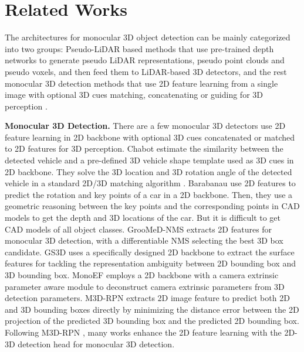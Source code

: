 \documentclass[10pt,twocolumn,letterpaper]{article}
\begin{document}
\section{Related Works}
The architectures for monocular 3D object detection can be mainly categorized into two groups:
Pseudo-LiDAR based methods \cite{Liang_corr,simonelli2021we,chu2021neighbor} that use pre-trained depth networks to
generate pseudo LiDAR representations,  pseudo point clouds and pseudo voxels, and then feed them to LiDAR-based 3D detectors, and the rest monocular 3D detection methods that use 2D feature learning from a single image with optional 3D cues matching, concatenating or guiding for 3D perception \cite{Lu_2021_ICCV,liu2021autoshape,MonoFlex,Zou_2021_ICCV,reading2021categorical,rukhovich2021imvoxelnet,murez2020atlas}. 


\textbf{Monocular 3D Detection.} There are a few monocular 3D detectors use 2D feature learning in 2D backbone with optional 3D cues concatenated or matched to 2D features for 3D perception.
Chabot  \cite{chabot2017deep} estimate the similarity between the detected vehicle and a pre-defined 3D vehicle shape template used as 3D cues in 2D backbone. They solve the 3D location and 3D rotation angle of the detected vehicle in a standard 2D/3D matching algorithm \cite{lepetit2009epnp}. Barabanau  \cite{barabanau2019monocular} use 2D features to predict the rotation and key points of a car in a 2D backbone. Then, they use a geometric reasoning between the key points and the corresponding points in CAD models to get the depth and 3D locations of the car. But it is difficult to get CAD models of all object classes.
GrooMeD-NMS \cite{kumar2021groomed} extracts 2D features for monocular 3D detection, with a differentiable NMS selecting the best 3D box candidate. GS3D \cite{li2019gs3d} uses a specifically designed 2D backbone to extract the surface features for tackling the representation ambiguity between 2D bounding box and 3D bounding box. MonoEF \cite{zhou2021monocular} employs a 2D backbone with a camera extrinsic parameter aware module to deconstruct camera extrinsic parameters from 3D detection parameters. M3D-RPN \cite{brazil2019m3d} extracts 2D image feature to predict both 2D and 3D bounding boxes directly by minimizing the distance error between the 2D projection of the predicted 3D bounding box and the predicted 2D bounding box. Following M3D-RPN \cite{brazil2019m3d}, many works \cite{luo2021m3dssd,park2021pseudo,peng2021lidar} enhance the 2D feature learning with the 2D-3D detection head for monocular 3D detection. 
\end{document}
